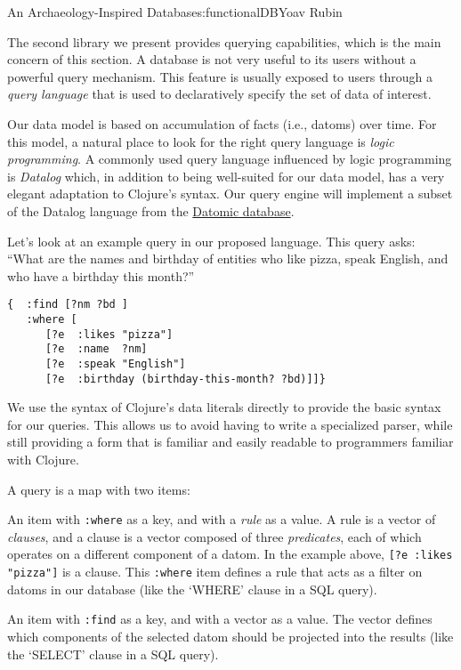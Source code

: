 \begin{aosachapter}{An Archaeology-Inspired Database}{s:functionalDB}{Yoav Rubin}
\label{querying-the-database}

The second library we present provides querying capabilities, which is
the main concern of this section. A database is not very useful to its
users without a powerful query mechanism. This feature is usually
exposed to users through a \emph{query language} that is used to
declaratively specify the set of data of interest.

Our data model is based on accumulation of facts (i.e., datoms) over
time. For this model, a natural place to look for the right query
language is \emph{logic programming}. A commonly used query language
influenced by logic programming is \emph{Datalog} which, in addition to
being well-suited for our data model, has a very elegant adaptation to
Clojure's syntax. Our query engine will implement a subset of the
Datalog language from the
\href{http://docs.datomic.com/query.html}{Datomic database}.

\label{query-language}

Let's look at an example query in our proposed language. This query
asks: ``What are the names and birthday of entities who like pizza,
speak English, and who have a birthday this month?''

\begin{verbatim}
{  :find [?nm ?bd ]
   :where [
      [?e  :likes "pizza"]
      [?e  :name  ?nm] 
      [?e  :speak "English"]
      [?e  :birthday (birthday-this-month? ?bd)]]}
\end{verbatim}

\label{syntax}

We use the syntax of Clojure's data literals directly to provide the
basic syntax for our queries. This allows us to avoid having to write a
specialized parser, while still providing a form that is familiar and
easily readable to programmers familiar with Clojure.

A query is a map with two items:

\begin{aosaitemize}

\item
  An item with \texttt{:where} as a key, and with a \emph{rule} as a
  value. A rule is a vector of \emph{clauses}, and a clause is a vector
  composed of three \emph{predicates}, each of which operates on a
  different component of a datom. In the example above,
  \texttt{{[}?e  :likes "pizza"{]}} is a clause. This \texttt{:where}
  item defines a rule that acts as a filter on datoms in our database
  (like the `WHERE' clause in a SQL query).
\item
  An item with \texttt{:find} as a key, and with a vector as a value.
  The vector defines which components of the selected datom should be
  projected into the results (like the `SELECT' clause in a SQL query).
\end{aosaitemize}


\end{aosachapter}
